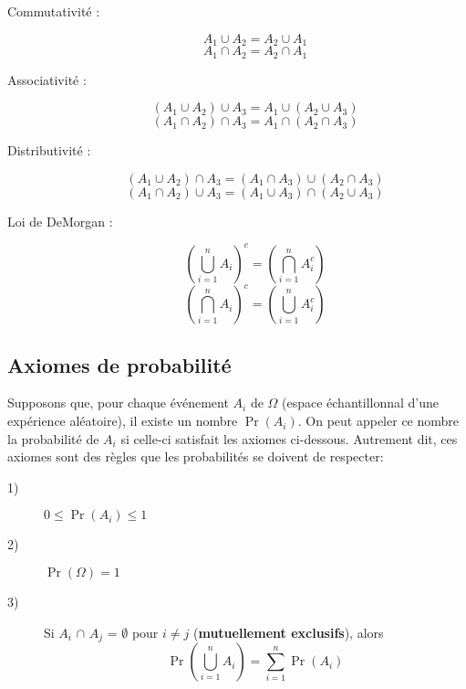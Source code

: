 \documentclass[10pt, french]{article}
\begin{document}
\begin{multicols*}{2}
\begin{definitionNOHFILLprop}
\begin{description}
  \item[Commutativité :] 
  $$A_1	\cup	A_2	=	A_2 \cup A_1$$ $$A_1	\cap	A_2	=	A_2 \cap A_1$$
  \item[Associativité :] $$(A_1 \cup A_2)	\cup A_3	=	A_1 \cup		(A_2 \cup A_3)$$ $$(A_1 \cap A_2)	\cap A_3	=	A_1 \cap		(A_2 \cap A_3)$$
  \item[Distributivité :] $$(A_1 \cup A_2)	\cap A_3 = (A_1 \cap A_3) \cup (A_2 \cap A_3)$$ $$(A_1 \cap A_2)	\cup A_3 = (A_1 \cup A_3) \cap (A_2 \cup A_3)$$
  \item[Loi de DeMorgan :] $$(\bigcup_{i = 1}^{n} A_{i})^{c} = (\bigcap_{i=1}^{n} A_i^{c})$$ $$(\bigcap_{i = 1}^{n} A_{i})^{c} = (\bigcup_{i=1}^{n} A_i^{c})$$
\end{description}
\end{definitionNOHFILLprop}
\vfill\null
\columnbreak

\subsection{Axiomes de probabilité}
\begin{definitionNOHFILLprop}
Supposons que, pour chaque événement $A_i$ de $\Omega$ (espace échantillonnal d'une expérience aléatoire), il existe un nombre $\Pr(A_i)$. On peut appeler ce nombre la probabilité de $A_i$ si celle-ci satisfait les axiomes ci-dessous. Autrement dit, ces axiomes sont des règles que les probabilités se doivent de respecter: 

\begin{description}
  \item[1)] $0 \leq \Pr(A_i) \leq 1$
  \item[2)] $\Pr(\Omega)=1$
  \item[3)] Si $A_i$ $\cap$ $A_j$ = $\emptyset$ pour $i \neq j$ (\textbf{mutuellement exclusifs}), alors $$\Pr(\bigcup_{i = 1}^{n} A_i) = \sum_{i = 1}^{n} \Pr(A_i)$$
\end{description}
\end{definitionNOHFILLprop}

\begin{definitionNOHFILLprop}


\end{definitionNOHFILLprop}
\end{multicols*}
\end{document}
